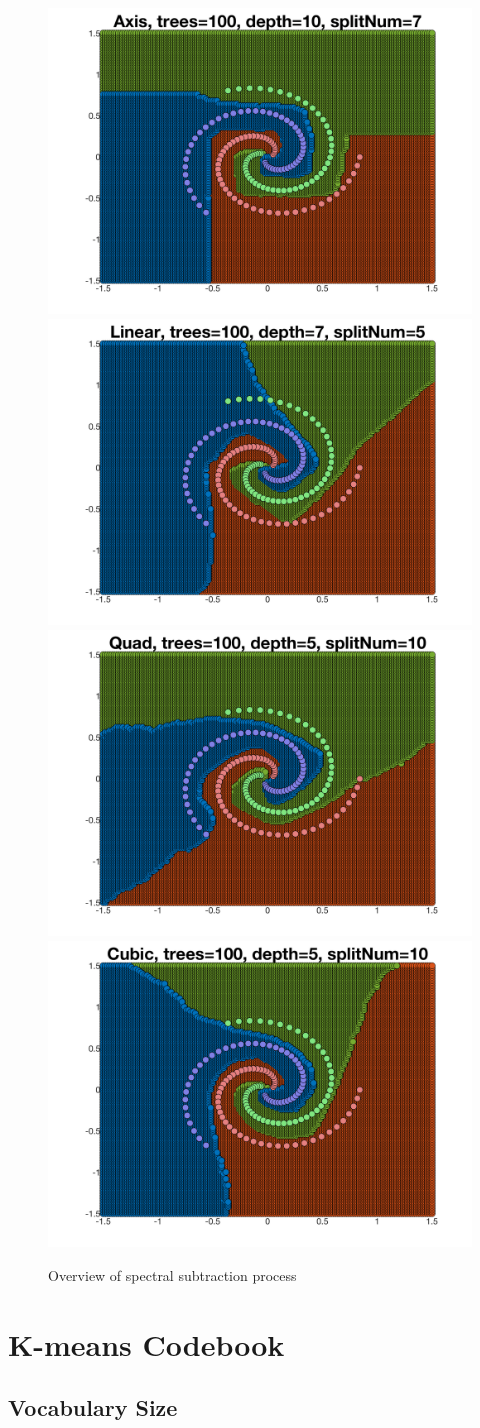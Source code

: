 \documentclass[a4paper,pra,twocolumn,10pt,aps,longbibliography,nobalancelastpage]{revtex4-1}
\begin{document}
\begin{figure}[H]
	\centering
    \includegraphics[width=0.40\columnwidth]{axis}
	\includegraphics[width=0.40\columnwidth]{linear}
    \includegraphics[width=0.40\columnwidth]{quad}
    \includegraphics[width=0.40\columnwidth]{cubic}
    \caption{Overview of spectral subtraction process}
\end{figure}


\section{K-means Codebook}

\subsection*{Vocabulary Size}
\end{document}
